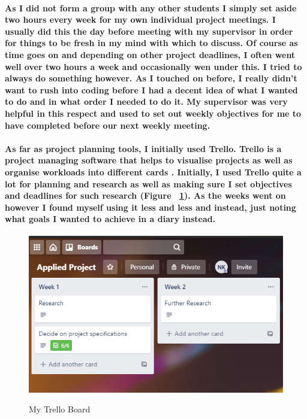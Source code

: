 \paragraph{As I did not form a group with any other students I simply set aside two hours every week for my own individual project meetings. I usually did this the day before meeting with my supervisor in order for things to be fresh in my mind with which to discuss. Of course as time goes on and depending on other project deadlines, I often went well over two hours a week and occasionally wen under this. I tried to always do something however. As I touched on before, I really didn't want to rush into coding before I had a decent idea of what I wanted to do and in what order I needed to do it. My supervisor was very helpful in this respect and used to set out weekly objectives for me to have completed before our next weekly meeting.}
\paragraph{As far as project planning tools, I initially used Trello. Trello is a project managing software that helps to visualise projects as well as organise workloads into different cards \cite{wiki:trello}. Initially, I used Trello quite a lot for planning and research as well as making sure I set objectives and deadlines for such research (Figure ~\ref{trello_label}). As the weeks went on however I found myself using it less and less and instead, just noting what goals I wanted to achieve in a diary instead.}
\begin{figure}
        \centering
        \includegraphics[scale=0.6]{Images/Trello.png} 
        \label{trello_label}
        \caption{My Trello Board}
\end{figure}

